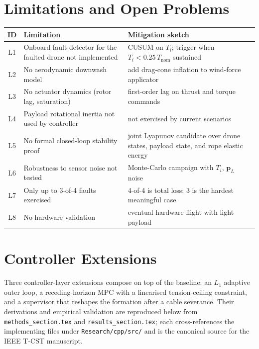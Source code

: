 \documentclass[11pt,a4paper,oneside]{report}
\newcommand{\bp}{\bm{p}}
\begin{document}
\chapter{Limitations and Open Problems}

\begin{longtable}{>{\ttfamily}c p{} p{}}
\toprule
\textbf{ID} & \textbf{Limitation} & \textbf{Mitigation sketch} \\
\midrule
L1 & Onboard fault detector for the faulted drone not implemented
   & CUSUM on $T_i$; trigger when $T_i<0.25\,T_\text{nom}$ sustained
   \\
L2 & No aerodynamic downwash model
   & add drag-cone inflation to wind-force applicator \\
L3 & No actuator dynamics (rotor lag, saturation)
   & first-order lag on thrust and torque commands \\
L4 & Payload rotational inertia not used by controller
   & not exercised by current scenarios \\
L5 & No formal closed-loop stability proof
   & joint Lyapunov candidate over drone states, payload state, and
     rope elastic energy \\
L6 & Robustness to sensor noise not tested
   & Monte-Carlo campaign with $T_i$, $\bp_L$ noise \\
L7 & Only up to 3-of-4 faults exercised
   & 4-of-4 is total loss; 3 is the hardest meaningful case \\
L8 & No hardware validation
   & eventual hardware flight with light payload \\
\bottomrule
\end{longtable}

\chapter{Controller Extensions}
\label{chap:ext-impl}

Three controller-layer extensions compose on top of the baseline: an
$L_1$ adaptive outer loop, a receding-horizon MPC with a linearised
tension-ceiling constraint, and a supervisor that reshapes the
formation after a cable severance. Their derivations and empirical
validation are reproduced below from
\texttt{methods\_section.tex} and \texttt{results\_section.tex}; each
cross-references the implementing files under
\texttt{Research/cpp/src/} and is the canonical source for the IEEE
T-CST manuscript.


\end{document}
